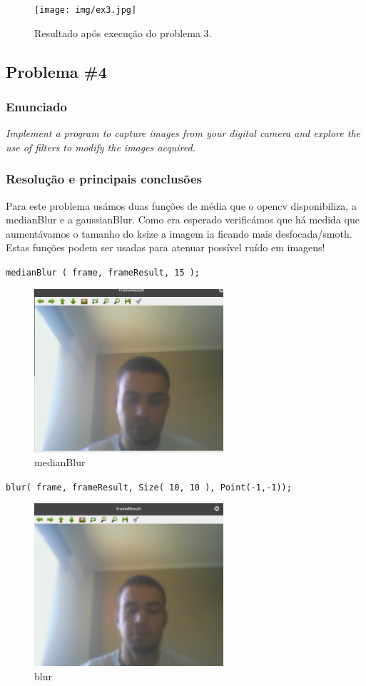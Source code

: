 \documentclass[portuguese, times, mirror]{revdetua}
\begin{document}
\begin{figure}[ht!]
\centering
\texttt{[image: img/ex3.jpg]}
\caption{Resultado após execução do problema 3.}
\end{figure}

\subsection{Problema \#4}

\subsubsection{Enunciado}
\textit{ Implement a program to capture images from your digital camera and explore the use of filters
to modify the images acquired.}

\subsubsection{Resolução e principais conclusões}

Para este problema usámos duas funções de média que o opencv disponibiliza, a medianBlur e a gaussianBlur. Como era esperado verificámos que há medida que aumentávamos o tamanho do ksize a imagem ia ficando mais desfocada/smoth. Estas funções podem ser usadas para atenuar possível ruído em imagens!
    

\texttt{medianBlur ( frame, frameResult, 15 );}

\begin{figure}[ht!]
\centering
\includegraphics[width=70mm]{img/4_1.png}
\caption{medianBlur}
\end{figure}


\texttt{blur( frame, frameResult, Size( 10, 10 ), Point(-1,-1));}

\begin{figure}[ht!]
\centering
\includegraphics[width=70mm]{img/4_2.png}
\caption{blur}
\end{figure}
\end{document}
